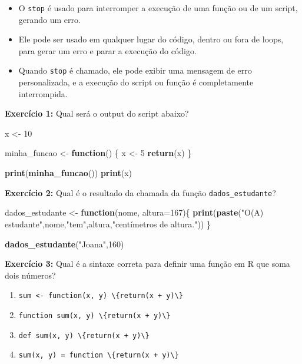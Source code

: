 \documentclass[
]{book}
\newenvironment{Shaded}{\begin{snugshade}}{\end{snugshade}}
\newcommand{\AttributeTok}[1]{\textcolor[rgb]{0.13,0.29,0.53}{#1}}
\newcommand{\ControlFlowTok}[1]{\textcolor[rgb]{0.13,0.29,0.53}{\textbf{#1}}}
\newcommand{\DecValTok}[1]{\textcolor[rgb]{0.00,0.00,0.81}{#1}}
\newcommand{\FunctionTok}[1]{\textcolor[rgb]{0.13,0.29,0.53}{\textbf{#1}}}
\newcommand{\NormalTok}[1]{#1}
\newcommand{\OtherTok}[1]{\textcolor[rgb]{0.56,0.35,0.01}{#1}}
\newcommand{\StringTok}[1]{\textcolor[rgb]{0.31,0.60,0.02}{#1}}
\begin{document}
\begin{itemize}
\item
  O \texttt{stop} é usado para interromper a execução de uma função ou de um script, gerando um erro.
\item
  Ele pode ser usado em qualquer lugar do código, dentro ou fora de loops, para gerar um erro e parar a execução do código.
\item
  Quando \texttt{stop} é chamado, ele pode exibir uma mensagem de erro personalizada, e a execução do script ou função é completamente interrompida.
\end{itemize}

\textbf{Exercício 1:} Qual será o output do script abaixo?

\begin{Shaded}
\begin{Highlighting}[]
\NormalTok{x }\OtherTok{\textless{}{-}} \DecValTok{10}  

\NormalTok{minha\_funcao }\OtherTok{\textless{}{-}} \ControlFlowTok{function}\NormalTok{() \{}
\NormalTok{    x }\OtherTok{\textless{}{-}} \DecValTok{5}  
    \FunctionTok{return}\NormalTok{(x)}
\NormalTok{\}}

\FunctionTok{print}\NormalTok{(}\FunctionTok{minha\_funcao}\NormalTok{()) }
\FunctionTok{print}\NormalTok{(x) }
\end{Highlighting}
\end{Shaded}

\textbf{Exercício 2:} Qual é o resultado da chamada da função \texttt{dados\_estudante}?

\begin{Shaded}
\begin{Highlighting}[]
\NormalTok{dados\_estudante }\OtherTok{\textless{}{-}} \ControlFlowTok{function}\NormalTok{(nome, }\AttributeTok{altura=}\DecValTok{167}\NormalTok{)\{}
  \FunctionTok{print}\NormalTok{(}\FunctionTok{paste}\NormalTok{(}\StringTok{"O(A) estudante"}\NormalTok{,nome,}\StringTok{"tem"}\NormalTok{,altura,}\StringTok{"centímetros de altura."}\NormalTok{))}
\NormalTok{\}}

\FunctionTok{dados\_estudante}\NormalTok{(}\StringTok{"Joana"}\NormalTok{,}\DecValTok{160}\NormalTok{)}
\end{Highlighting}
\end{Shaded}

\textbf{Exercício 3:} Qual é a sintaxe correta para definir uma função em R que soma dois números?

\begin{enumerate}
\def\labelenumi{(\alph{enumi})}
\item
  \texttt{sum\ \textless{}-\ function(x,\ y)\ \textbackslash{}\{return(x\ +\ y)\textbackslash{}\}}
\item
  \texttt{function\ sum(x,\ y)\ \textbackslash{}\{return(x\ +\ y)\textbackslash{}\}}
\item
  \texttt{def\ sum(x,\ y)\ \textbackslash{}\{return(x\ +\ y)\textbackslash{}\}}
\item
  \texttt{sum(x,\ y)\ =\ function\ \textbackslash{}\{return(x\ +\ y)\textbackslash{}\}}
\end{enumerate}
\end{document}
